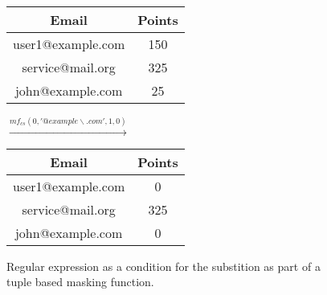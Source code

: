 \begin{figure}[ht]
    \begin{center}
    \footnotesize{
        \renewcommand{\arraystretch}{1.5}
        \begin{tabular}{|c|c|}
            \hline
            Email & Points \\
            \hline
            user1@example.com & 150 \\
            \hline
            service@mail.org & 325 \\
            \hline
            john@example.com & 25 \\
            \hline
        \end{tabular}
        \quad $\xrightarrow{mf_{cs}(0,'@example\backslash.com', 1, 0)}$ \quad
        \begin{tabular}{|c|c|}
            \hline
            Email & Points \\
            \hline
            user1@example.com & 0 \\
            \hline
            service@mail.org & 325 \\
            \hline
            john@example.com & 0 \\
            \hline
        \end{tabular}
    }
    \end{center}
    \caption{Regular expression as a condition for the substition as part of a tuple based masking function. \label{fig:condiSubRegex}}
\end{figure}

